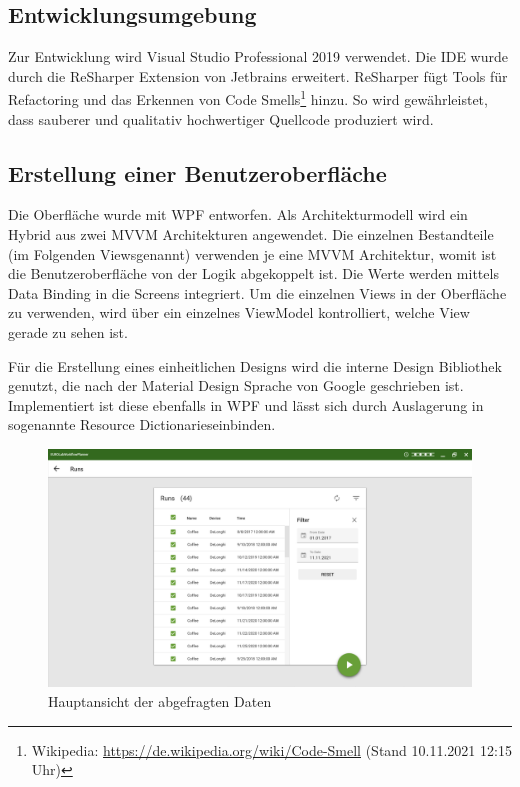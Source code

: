 \subsection{Entwicklungsumgebung}
\label{sec:Entwicklungsumgebung}
Zur Entwicklung wird Visual Studio Professional 2019 verwendet. Die IDE wurde durch die ReSharper Extension von Jetbrains erweitert. ReSharper fügt Tools für Refactoring und das Erkennen von Code Smells\footnote{Wikipedia: \url{https://de.wikipedia.org/wiki/Code-Smell} (Stand 10.11.2021 12:15 Uhr)} hinzu. So wird gewährleistet, dass sauberer und qualitativ hochwertiger Quellcode produziert wird.

\subsection{Erstellung einer Benutzeroberfläche}
\label{sec:ErstellungEinerBenutzeroberfläche}
Die Oberfläche wurde mit {\acs{WPF}} entworfen. Als Architekturmodell wird ein Hybrid aus zwei {\acs{MVVM}} Architekturen angewendet. Die einzelnen Bestandteile (im Folgenden \glqq Views\grqq \space genannt) verwenden je eine {\acs{MVVM}} Architektur, womit ist die Benutzeroberfläche von der Logik abgekoppelt ist. Die Werte werden mittels Data Binding in die Screens integriert. Um die einzelnen Views in der Oberfläche zu verwenden, wird über ein einzelnes ViewModel kontrolliert, welche View gerade zu sehen ist.

Für die Erstellung eines einheitlichen Designs wird die {\betriebNameKzf} interne Design Bibliothek genutzt, die nach der Material Design Sprache von Google geschrieben ist. Implementiert ist diese ebenfalls in {\acs{WPF}} und lässt sich durch Auslagerung in sogenannte \glqq Resource Dictionaries\grqq \space einbinden.

\begin{figure}[htb]
	\centering
	\includegraphics[scale=0.5]{Bilder/RunsAnsicht.png}
	\caption{Hauptansicht der abgefragten Daten}
	\label{fig:Runs}
\end{figure} 

